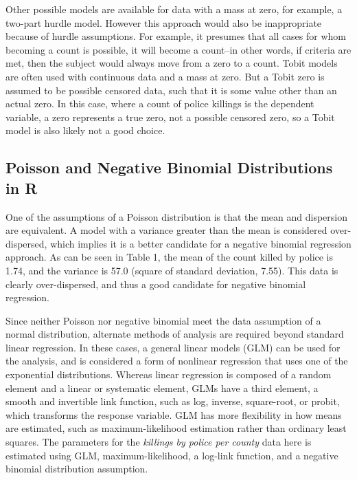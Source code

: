 \documentclass[sigconf]{acmart}
\begin{document}
Other possible models are available for data with a mass at zero, for example, a two-part hurdle model.  However this approach would also be inappropriate because of hurdle assumptions.  For example, it presumes that all cases for whom becoming a count is possible, it will become a count--in other words, if criteria are met, then the subject would always move from a zero to a count. \cite{moore04, feng16}  Tobit models are often used with continuous data and a mass at zero.  But a Tobit zero is assumed to be possible censored data, such that it is some value other than an actual zero.  In this case, where a count of police killings is the dependent variable, a zero represents a true zero, not a possible censored zero, so a Tobit model is also likely not a good choice. \cite{neelon16,min02}  

\subsection{Poisson and Negative Binomial Distributions in R}
One of the assumptions of a Poisson distribution is that the mean and dispersion are equivalent. A model with a variance greater than the mean is considered over-dispersed, which implies it is a better candidate for a negative binomial regression approach. \cite{fox15,beaujean16,smith14,legewie15}  As can be seen in Table 1, the mean of the count killed by police is 1.74, and the variance is 57.0 (square of standard deviation, 7.55).  This data is clearly over-dispersed, and thus a good candidate for negative binomial regression.  

Since neither Poisson nor negative binomial meet the data assumption of a normal distribution, alternate methods of analysis are required beyond standard linear regression. \cite{fox15,farewell17,beaujean16}  In these cases, a general linear models (GLM) can be used for the analysis, and is considered a form of nonlinear regression that uses one of the exponential distributions. \cite{jones11,min02,fox15}  Whereas linear regression is composed of a random element and a linear or systematic element, GLMs have a third element, a smooth and invertible link function, such as log, inverse, square-root, or probit, which transforms the response variable. \cite{fox15}  GLM has more flexibility in how means are estimated, such as maximum-likelihood estimation rather than ordinary least squares.  The parameters for the {\em killings by police per county} data here is estimated using GLM, maximum-likelihood, a log-link function, and a negative binomial distribution assumption.  
\end{document}
